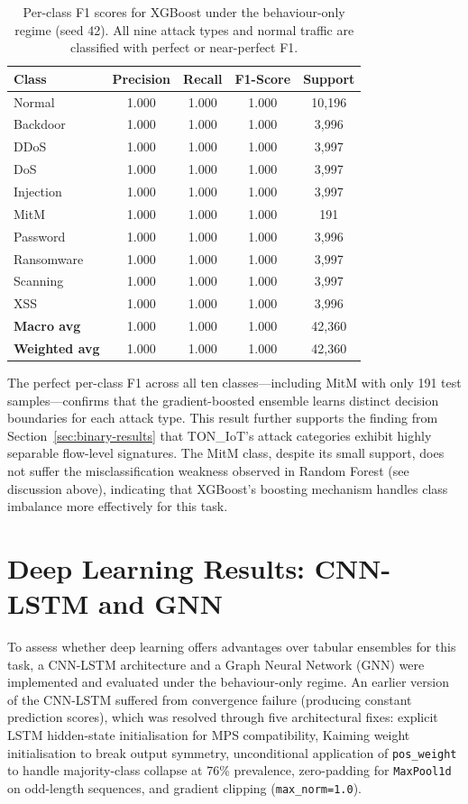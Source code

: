 \documentclass[12pt,a4paper]{report}
\begin{document}
\begin{table}[H]
\centering
\caption{Per-class F1 scores for XGBoost under the behaviour-only regime (seed 42). All nine attack types and normal traffic are classified with perfect or near-perfect F1.}
\label{tab:perclass-f1}
\begin{tabular}{lcccc}
\toprule
\textbf{Class} & \textbf{Precision} & \textbf{Recall} & \textbf{F1-Score} & \textbf{Support} \\
\midrule
Normal & 1.000 & 1.000 & 1.000 & 10,196 \\
Backdoor & 1.000 & 1.000 & 1.000 & 3,996 \\
DDoS & 1.000 & 1.000 & 1.000 & 3,997 \\
DoS & 1.000 & 1.000 & 1.000 & 3,997 \\
Injection & 1.000 & 1.000 & 1.000 & 3,997 \\
MitM & 1.000 & 1.000 & 1.000 & 191 \\
Password & 1.000 & 1.000 & 1.000 & 3,996 \\
Ransomware & 1.000 & 1.000 & 1.000 & 3,997 \\
Scanning & 1.000 & 1.000 & 1.000 & 3,997 \\
XSS & 1.000 & 1.000 & 1.000 & 3,996 \\
\midrule
\textbf{Macro avg} & 1.000 & 1.000 & 1.000 & 42,360 \\
\textbf{Weighted avg} & 1.000 & 1.000 & 1.000 & 42,360 \\
\bottomrule
\end{tabular}
\end{table}

The perfect per-class F1 across all ten classes---including MitM with only 191 test samples---confirms that the gradient-boosted ensemble learns distinct decision boundaries for each attack type. This result further supports the finding from Section~\ref{sec:binary-results} that TON\_IoT's attack categories exhibit highly separable flow-level signatures. The MitM class, despite its small support, does not suffer the misclassification weakness observed in Random Forest (see discussion above), indicating that XGBoost's boosting mechanism handles class imbalance more effectively for this task.

\section{Deep Learning Results: CNN-LSTM and GNN}
\label{sec:cnnlstm-results}

To assess whether deep learning offers advantages over tabular ensembles for this task, a CNN-LSTM architecture and a Graph Neural Network (GNN) were implemented and evaluated under the behaviour-only regime. An earlier version of the CNN-LSTM suffered from convergence failure (producing constant prediction scores), which was resolved through five architectural fixes: explicit LSTM hidden-state initialisation for MPS compatibility, Kaiming weight initialisation to break output symmetry, unconditional application of \texttt{pos\_weight} to handle majority-class collapse at 76\% prevalence, zero-padding for \texttt{MaxPool1d} on odd-length sequences, and gradient clipping (\texttt{max\_norm=1.0}).
\end{document}
